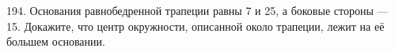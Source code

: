 194. Основания равнобедренной трапеции равны 7 и 25, а боковые стороны --- 15. Докажите, что центр окружности, описанной около трапеции, лежит на её большем основании.\\
